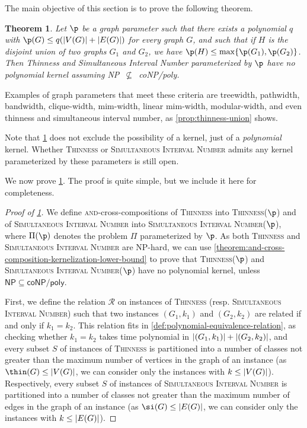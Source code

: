 \documentclass[11pt]{article}
\theoremstyle{plain}
\newtheorem{theorem}{Theorem}
\theoremstyle{definition}
\theoremstyle{remark}
\newcommand{\NP}{{\smaller[0.83]\textsf{\textup{NP}}}}
\newcommand{\coNP}{{\smaller[0.83]\textsf{\textup{coNP}}}}
\newcommand{\poly}{{\smaller[0.83]\textsf{\textup{poly}}}}
\newcommand{\Hip}{\NP~$\not\subseteq$~\coNP/\poly}
\DeclarePairedDelimiter\abs{\lvert}{\rvert}
\begin{document}
\begin{appendices}
The main objective of this section is to prove the following theorem.
\begin{theorem}
\label{theorem:thinness-kernelization-lower-bound}
    Let $\p$ be a graph parameter such that there exists a polynomial $q$ with $\p(G) \leq q(\abs{V(G)} + \abs{E(G)})$ for every graph $G$, and such that if $H$ is the disjoint union of two graphs $G_1$ and $G_2$, we have $\p(H) \leq \max\{\p(G_1),\allowbreak \p(G_2)\}$. Then {\sc Thinness} {and {\sc Simultaneous Interval Number}} parameterized by $\p$ {have} no polynomial kernel assuming \Hip.
\end{theorem}

Examples of graph parameters that meet these criteria are treewidth, pathwidth, bandwidth, clique-width, mim-width, linear mim-width, modular-width, and even thinness {and simultaneous interval number}, as \cref{prop:thinness-union} shows.

Note that \cref{theorem:thinness-kernelization-lower-bound} does not exclude the possibility of a kernel, just of a \emph{polynomial} kernel. Whether \textsc{Thinness} or \textsc{Simultaneous Interval Number} admits any kernel parameterized by these parameters is still open.

We now prove \cref{theorem:thinness-kernelization-lower-bound}. The proof is quite simple, but we include it here for completeness.

\begin{proof}[Proof of \cref{theorem:thinness-kernelization-lower-bound}]
    We define \textsc{and}-cross-compositions of \textsc{Thinness} into \textsc{Thinness($\p$)} {and of \textsc{Simultaneous Interval Number} into \textsc{Simultaneous Interval Number($\p$)}}, {where $\Pi(\p)$ denotes the problem $\Pi$ parameterized by $\p$}. As {both} \textsc{Thinness} {and \textsc{Simultaneous Interval Number} are} \textsf{NP}-hard, we can use \cref{theorem:and-cross-composition-kernelization-lower-bound} to prove that \textsc{Thinness($\p$)} {and \textsc{Simultaneous Interval Number($\p$)} have} no polynomial kernel, unless $\textsf{NP} \subseteq \textsf{coNP} / \textsf{poly}$.

    First, we define the relation $\mathcal{R}$ on instances of \textsc{Thinness} {(resp. \textsc{Simultaneous Interval Number})} such that two instances $(G_1, k_1)$ and $(G_2, k_2)$ are related if and only if $k_1 = k_2$. This relation fits in \cref{def:polynomial-equivalence-relation}, as checking whether $k_1 = k_2$ takes time polynomial in $\abs{(G_1, k_1)} + \abs{(G_2, k_2)}$, and every subset $S$ of instances of \textsc{Thinness} is partitioned into a number of classes not greater than the maximum number of vertices in the graph of an instance (as $\thin(G)\leq |V(G)|$, we can consider only the instances with $k \leq \abs{V(G)}$). {Respectively, every subset $S$ of instances of \textsc{Simultaneous Interval Number} is partitioned into a number of classes not greater than the maximum number of edges in the graph of an instance (as $\si(G)\leq |E(G)|$, we can consider only the instances with $k \leq \abs{E(G)}$).}
    

\end{proof}
\end{appendices}
\end{document}
